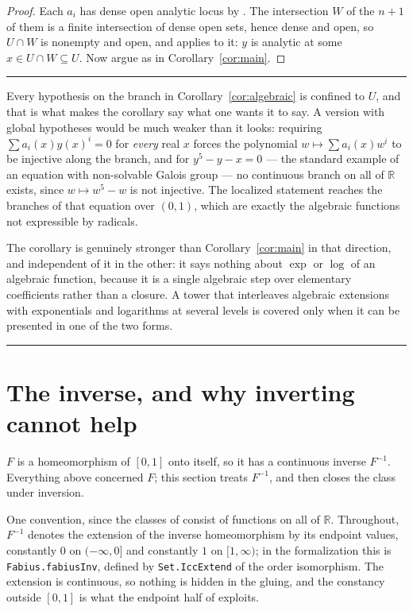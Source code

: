 \documentclass[11pt,oneside]{article}
\theoremstyle{definition}
\theoremstyle{remark}
\newcommand{\R}{\mathbb R}
\newenvironment{boxedremark}{%
  \par\smallskip\noindent\begin{center}\begin{minipage}{0.94\textwidth}%
  \color{black}\hrule\vspace{0.6em}\small
}{%
  \vspace{0.6em}\hrule\end{minipage}\end{center}\smallskip
}
\begin{document}
\begin{proof}
Each $a_i$ has dense open analytic locus by .  The
intersection $W$ of the $n+1$ of them is a finite intersection of dense open
sets, hence dense and open, so $U\cap W$ is nonempty and open, and
 applies to it: $y$ is analytic at some $x\in U\cap
W\subseteq U$.  Now argue as in Corollary~\ref{cor:main}.
\end{proof}

\begin{boxedremark}
Every hypothesis on the branch in Corollary~\ref{cor:algebraic} is confined to
$U$, and that is what makes the corollary say what one wants it to say.  A
version with global hypotheses would be much weaker than it looks: requiring
$\sum a_i(x)y(x)^i=0$ for \emph{every} real $x$ forces the polynomial
$w\mapsto\sum a_i(x)w^i$ to be injective along the branch, and for
$y^5-y-x=0$ --- the standard example of an equation with non-solvable Galois
group --- no continuous branch on all of $\R$ exists, since $w\mapsto w^5-w$
is not injective.  The localized statement reaches the branches of that
equation over $(0,1)$, which are exactly the algebraic functions not
expressible by radicals.

The corollary is genuinely stronger than Corollary~\ref{cor:main} in that
direction, and independent of it in the other: it says nothing about $\exp$ or
$\log$ of an algebraic function, because it is a single algebraic step over
elementary coefficients rather than a closure.  A tower that interleaves
algebraic extensions with exponentials and logarithms at several levels is
covered only when it can be presented in one of the two forms.
\end{boxedremark}

\section{The inverse, and why inverting cannot help}\label{sec:inverse}

$F$ is a homeomorphism of $[0,1]$ onto itself, so it has a continuous inverse
$F^{-1}$.  Everything above concerned $F$; this section treats $F^{-1}$, and
then closes the class under inversion.

One convention, since the classes of  consist of functions on
all of $\R$.  Throughout, $F^{-1}$ denotes the extension of the inverse
homeomorphism by its endpoint values, constantly $0$ on $(-\infty,0]$ and
constantly $1$ on $[1,\infty)$; in the formalization this is
\texttt{Fabius.fabiusInv}, defined by \texttt{Set.IccExtend} of the order
isomorphism.  The extension is continuous, so nothing is hidden in the
gluing, and the constancy outside $[0,1]$ is what the endpoint half of
 exploits.
\end{document}
